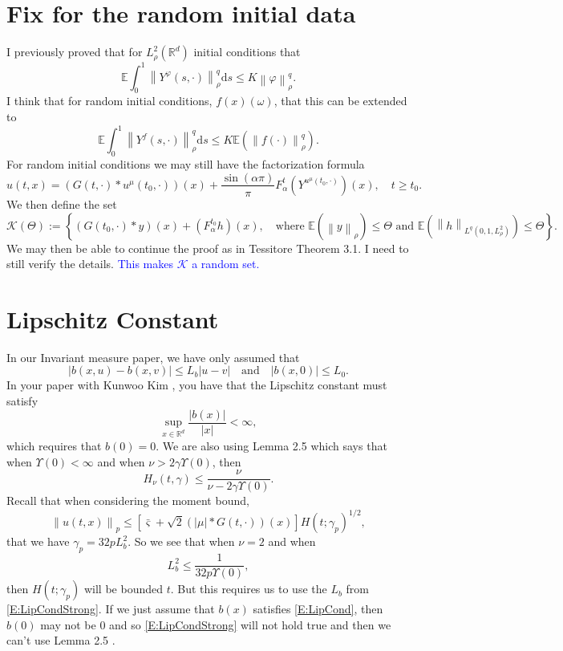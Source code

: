 \documentclass{article}
\numberwithin{equation}{section}
\newcommand{\R}{\mathbb{R}}
\newcommand{\Norm}[1]{\left\|  #1   \right\|}
\newcommand{\ud}{\ensuremath{\mathrm{d}}}
\begin{document}
\section{Fix for the random initial data}

I previously proved that for $L^2_{\rho}(\R^d)$ initial conditions that
	\[
		\mathbb{E} \int_0^1 \Norm{Y^{\varphi}(s,\cdot)}_{\rho}^q \ud s \le K \Norm{\varphi}_\rho^q.
	\]
I think that for random initial conditions, $f(x)(\omega)$, that this can be extended to
	\[
		\mathbb{E} \int_0^1 \Norm{Y^{f}(s,\cdot)}_{\rho}^q \ud s \le K \mathbb{E}\left(\Norm{f(\cdot)}_{\rho}^q\right).
	\]
For random initial conditions we may still have the factorization formula
	\[
		u(t,x) = (G(t,\cdot)*u^\mu(t_0,\cdot))(x) + \frac{\sin(\alpha \pi)}{\pi}F_\alpha^t(Y^{u^\mu(t_0,\cdot)})(x), \quad t\ge t_0.
	\]
We then define the set
	\[
		\mathcal{K}(\Theta) := \left\{ (G(t_0,\cdot)*y)(x) + (F_\alpha^{t_0}h)(x), \quad \text{where } \mathbb{E}(\Norm{y}_{\rho}) \le \Theta \text{ and } \mathbb{E}(\Norm{h}_{L^q(0,1,L^2_{\rho})}) \le \Theta \right\}.
	\]
We may then be able to continue the proof as in Tessitore Theorem 3.1. I need to still verify the details. \textcolor{blue}{This makes $\mathcal{K}$ a random set.}

\section{Lipschitz Constant}
In our Invariant measure paper, we have only assumed that
	\begin{equation} \label{E:LipCond}
		|b(x,u) - b(x,v)| \le L_b |u-v| \quad \text{and} \quad |b(x,0)| \le L_0.
	\end{equation}
In your paper with Kunwoo Kim \cite{CK19}, you have that the Lipschitz constant must satisfy
	\begin{equation} \label{E:LipCondStrong}
		\sup_{x \in \R^d} \frac{|b(x)|}{|x|} < \infty,
	\end{equation}
which requires that $b(0) = 0$. We are also using Lemma 2.5 \cite{CK19} which says that when $\Upsilon(0) < \infty$ and when $\nu > 2 \gamma \Upsilon(0)$, then
	\[
		H_\nu(t,\gamma) \le \frac{\nu}{\nu - 2\gamma \Upsilon(0)}.
	\]
Recall that when considering the moment bound,
	\[
		\Norm{u(t,x)}_p \le [\bar\varsigma + \sqrt{2}(|\mu|*G(t,\cdot))(x)]H(t;\gamma_p)^{1/2},
	\]
that we have $\gamma_p = 32pL_b^2$. So we see that when $\nu = 2$ and when
	\[
		L_b^2 \le \frac{1}{32p\Upsilon(0)},
	\]
then $H(t;\gamma_p)$ will be bounded $t$. But this requires us to use the $L_b$ from \eqref{E:LipCondStrong}. If we just assume that $b(x)$ satisfies \eqref{E:LipCond}, then $b(0)$ may not be $0$ and so \eqref{E:LipCondStrong} will not hold true and then we can't use Lemma 2.5 \cite{CK19}.
\end{document}
